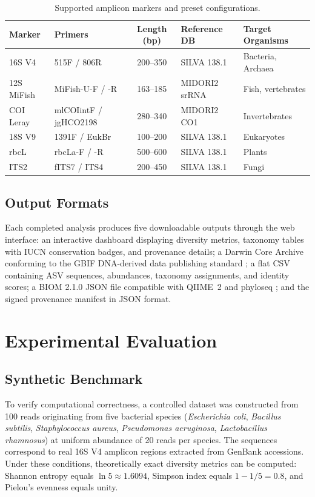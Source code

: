 \documentclass[runningheads]{llncs}
\begin{document}
\begin{table}[t]
\centering
\caption{Supported amplicon markers and preset configurations.}
\label{tab:markers}
\begin{tabular}{llcll}
\toprule
\textbf{Marker} & \textbf{Primers} & \textbf{Length (bp)} & \textbf{Reference DB} & \textbf{Target Organisms} \\
\midrule
16S V4    & 515F / 806R           & 200--350 & SILVA 138.1      & Bacteria, Archaea \\
12S MiFish & MiFish-U-F / -R      & 163--185 & MIDORI2 srRNA    & Fish, vertebrates \\
COI Leray  & mlCOIintF / jgHCO2198 & 280--340 & MIDORI2 CO1     & Invertebrates \\
18S V9    & 1391F / EukBr         & 100--200 & SILVA 138.1      & Eukaryotes \\
rbcL      & rbcLa-F / -R          & 500--600 & SILVA 138.1      & Plants \\
ITS2      & fITS7 / ITS4          & 200--450 & SILVA 138.1      & Fungi \\
\bottomrule
\end{tabular}
\end{table}

\subsection{Output Formats}

Each completed analysis produces five downloadable outputs through the web interface: an interactive dashboard displaying diversity metrics, taxonomy tables with IUCN conservation badges, and provenance details; a Darwin Core Archive conforming to the GBIF DNA-derived data publishing standard \cite{gbif2023}; a flat CSV containing ASV sequences, abundances, taxonomy assignments, and identity scores; a BIOM 2.1.0 JSON file compatible with QIIME~2 and phyloseq \cite{mcmurdie2013}; and the signed provenance manifest in JSON format.

\section{Experimental Evaluation}

\subsection{Synthetic Benchmark}

To verify computational correctness, a controlled dataset was constructed from 100 reads originating from five bacterial species (\textit{Escherichia coli}, \textit{Bacillus subtilis}, \textit{Staphylococcus aureus}, \textit{Pseudomonas aeruginosa}, \textit{Lactobacillus rhamnosus}) at uniform abundance of 20 reads per species. The sequences correspond to real 16S V4 amplicon regions extracted from GenBank accessions. Under these conditions, theoretically exact diversity metrics can be computed: Shannon entropy equals $\ln 5 \approx 1.6094$, Simpson index equals $1 - 1/5 = 0.8$, and Pielou's evenness equals unity.
\end{document}
